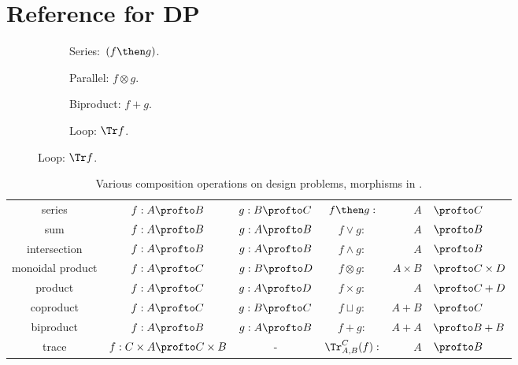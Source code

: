 
\section{Reference for DP}



\begin{figure}[h!]
    \centering
    \begin{subfigure}{0.2\textwidth}
        \centering
        \caption{Series:~$(f \then g)$.}
    \end{subfigure}
    \hspace{10mm} %
    \begin{subfigure}{0.2\textwidth}
        \centering
        \caption{Parallel: $f \otimes g$.}
    \end{subfigure}
    \hspace{10mm} %
    \begin{subfigure}{0.2\textwidth}
        \centering
        \caption{Biproduct: $f + g$.}
    \end{subfigure}
    \hspace{10mm} %
    \begin{subfigure}{0.2\textwidth}
        \centering
        \caption{Loop: $\Tr f$.}
    \end{subfigure}
    \label{fig:diagrams}
\end{figure}

\begin{table}[t!]
    \centering
    \begin{tabular}{c|c|c|crl}
        series &
        $f:A\profto B$ &
        $g:B\profto C$ &
        $f\then g:$ & $A$ & $\profto C$ \\
        sum &
        $f:A\profto B$ &
        $g:A\profto B$ &
        $f\vee g:$ & $A$ & $\profto B$ \\
        intersection &
        $f:A\profto B$ &
        $g:A\profto B$ &
        $f\wedge g:$ & $A$ & $\profto B$ \\
        monoidal product &
        $f:A\profto C$ &
        $g:B\profto D$ &
        $f\otimes g:$ & $A\times B$ & $\profto C \times D$ \\
        product &
        $f:A\profto C$ &
        $g:A\profto D$ &
        $f\times g:$ & $A $ & $\profto C + D$ \\
        coproduct &
        $f:A\profto C$ &
        $g:B\profto C$ &
        $f\sqcup g:$ & $A + B $ & $\profto C$ \\
        biproduct &
        $f:A\profto B$ &
        $g:A\profto B$ &
        $f+ g:$ & $A + A$ & $\profto B + B$ \\
        trace &
        $f: C \times A \profto C \times B$ &
        - &
        $\Tr_{A,B}^C(f) :$ & $A$ & $\profto B$
    \end{tabular}
    \caption{Various composition operations on design problems, morphisms in \DP.}
\end{table}
